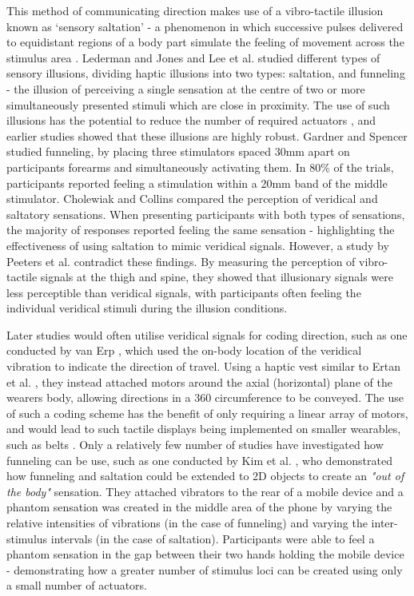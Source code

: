 \documentclass{interim}
\begin{document}
This method of communicating direction makes use of a vibro-tactile illusion known as ‘sensory saltation' - a phenomenon in which successive pulses delivered to equidistant regions of a body part simulate the feeling of movement across the stimulus area \cite{geldard1975sensory}. Lederman and Jones \cite{5710913} and Lee et al. \cite{s150407913} studied different types of sensory illusions, dividing haptic illusions into two types: saltation, and funneling - the illusion of perceiving a single sensation at the centre of two or more simultaneously presented stimuli which are close in proximity. The use of such illusions has the potential to reduce the number of required actuators \cite{10.1007/s00779-015-0894-4}, and earlier studies showed that these illusions are highly robust. Gardner and Spencer \cite{gardner1972sensory} studied funneling, by placing three stimulators spaced 30mm apart on participants forearms and simultaneously activating them. In 80\% of the trials, participants reported feeling a stimulation within a 20mm band of the middle stimulator. Cholewiak and Collins \cite{cholewiak2000generation} compared the perception of veridical and saltatory sensations. When presenting participants with both types of sensations, the majority of responses reported feeling the same sensation - highlighting the effectiveness of using saltation to mimic veridical signals. However, a study by Peeters et al. \cite{peeters2019vibrotactile} contradict these findings. By measuring the perception of vibro-tactile signals at the thigh and spine, they showed that illusionary signals were less perceptible than veridical signals, with participants often feeling the individual veridical stimuli during the illusion conditions.

Later studies would often utilise veridical signals for coding direction, such as one conducted by van Erp \cite{van2000tactile}, which used the on-body location of the veridical vibration to indicate the direction of travel. Using a haptic vest similar to Ertan et al. \cite{729547}, they instead attached motors around the axial (horizontal) plane of the wearers body, allowing directions in a 360\degree{} circumference to be conveyed. The use of such a coding scheme has the benefit of only requiring a linear array of motors, and would lead to such tactile displays being implemented on smaller wearables, such as belts \cite{10.1145/1613858.1613911, 10.1145/2449396.2449450, 10.1145/1060581.1060585}. Only a relatively few number of studies have investigated how funneling can be use, such as one conducted by Kim et al. \cite{10.1007/s00779-015-0894-4}, who demonstrated how funneling and saltation could be extended to 2D objects to create an \textit{"out of the body"} sensation. They attached vibrators to the rear of a mobile device and a phantom sensation was created in the middle area of the phone by varying the relative intensities of vibrations (in the case of funneling) and varying the inter-stimulus intervals (in the case of saltation). Participants were able to feel a phantom sensation in the gap between their two hands holding the mobile device - demonstrating how a greater number of stimulus loci can be created using only a small number of actuators.
\end{document}
